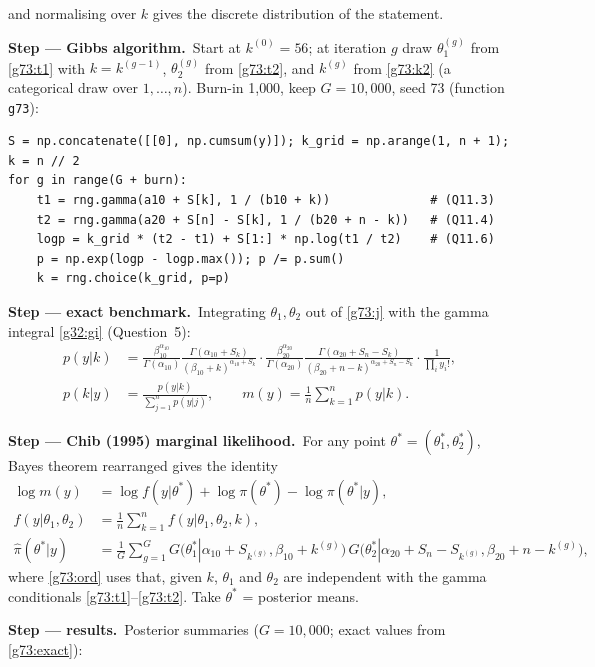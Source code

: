 \documentclass[11pt,a4paper]{article}
\newcommand{\passo}[2]{\par\smallskip\noindent\textbf{Step --- #1.}~#2}
\begin{document}
\begin{sol}
{\begin{align}
\end{align}
and normalising over $k$ gives the discrete distribution of the statement.}
\passo{Gibbs algorithm}{Start at $k^{(0)}=56$; at iteration $g$ draw $\theta_1^{(g)}$ from \eqref{g73:t1} with $k=k^{(g-1)}$, $\theta_2^{(g)}$ from \eqref{g73:t2}, and $k^{(g)}$ from \eqref{g73:k2} (a categorical draw over $1,\ldots,n$). Burn-in 1{,}000, keep $G=10{,}000$, seed 73 (function \texttt{g73}):}
\begin{lstlisting}
S = np.concatenate([[0], np.cumsum(y)]); k_grid = np.arange(1, n + 1); k = n // 2
for g in range(G + burn):
    t1 = rng.gamma(a10 + S[k], 1 / (b10 + k))              # (Q11.3)
    t2 = rng.gamma(a20 + S[n] - S[k], 1 / (b20 + n - k))   # (Q11.4)
    logp = k_grid * (t2 - t1) + S[1:] * np.log(t1 / t2)    # (Q11.6)
    p = np.exp(logp - logp.max()); p /= p.sum()
    k = rng.choice(k_grid, p=p)
\end{lstlisting}
\passo{exact benchmark}{Integrating $\theta_1,\theta_2$ out of \eqref{g73:j} with the gamma integral \eqref{g32:gi} (Question~5):
\begin{align}
p(y|k)&=\frac{\beta_{10}^{\alpha_{10}}}{\Gamma(\alpha_{10})}\frac{\Gamma(\alpha_{10}+S_k)}{(\beta_{10}+k)^{\alpha_{10}+S_k}}\cdot\frac{\beta_{20}^{\alpha_{20}}}{\Gamma(\alpha_{20})}\frac{\Gamma(\alpha_{20}+S_n-S_k)}{(\beta_{20}+n-k)^{\alpha_{20}+S_n-S_k}}\cdot\frac{1}{\prod_iy_i!},\label{g73:pyk}\\
p(k|y)&=\frac{p(y|k)}{\sum_{j=1}^np(y|j)},\qquad m(y)=\frac1n\sum_{k=1}^np(y|k).\label{g73:exact}
\end{align}}
\passo{Chib (1995) marginal likelihood}{For any point $\theta^*=(\theta_1^*,\theta_2^*)$, Bayes theorem rearranged gives the identity
\begin{align}
\log m(y)&=\log f(y|\theta^*)+\log\pi(\theta^*)-\log\pi(\theta^*|y),\label{g73:chib}\\
f(y|\theta_1,\theta_2)&=\frac1n\sum_{k=1}^nf(y|\theta_1,\theta_2,k),\label{g73:lik}\\
\hat\pi(\theta^*|y)&=\frac1G\sum_{g=1}^GG\big(\theta_1^*|\alpha_{10}+S_{k^{(g)}},\beta_{10}+k^{(g)}\big)\,G\big(\theta_2^*|\alpha_{20}+S_n-S_{k^{(g)}},\beta_{20}+n-k^{(g)}\big),\label{g73:ord}
\end{align}
where \eqref{g73:ord} uses that, given $k$, $\theta_1$ and $\theta_2$ are independent with the gamma conditionals \eqref{g73:t1}--\eqref{g73:t2}. Take $\theta^*$ = posterior means.}
\passo{results}{Posterior summaries ($G=10{,}000$; exact values from \eqref{g73:exact}):
\begin{center}\small

\end{center}}
\end{sol}
\end{document}

